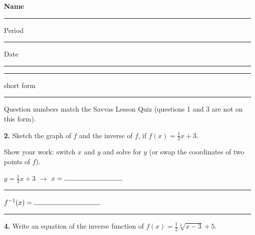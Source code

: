\documentclass[11pt]{article}
\begin{document}
\noindent\textbf{Name}\; \rule{6cm}{0.4pt} \hfill Period \rule{1.2cm}{0.4pt} \quad Date \rule{2.2cm}{0.4pt}

\vspace{4pt}\noindent\rule{\textwidth}{0.6pt}

\vspace{2pt} \hfill {\small short form}

\vspace{4pt}\noindent\rule{\textwidth}{0.6pt}

{\small Question numbers match the Savvas Lesson Quiz (questions 1 and 3 are not on this form).}

\vspace{4pt}
\begin{minipage}[t]{0.50\textwidth}
\textbf{2.} Sketch the graph of $f$ and the inverse of $f$, if $f(x)=\tfrac12x+3$.

\vspace{8pt}
Show your work: switch $x$ and $y$ and solve for $y$ (or swap the coordinates of two points of $f$).

\vspace{10pt}
$y=\tfrac12x+3$ \;$\longrightarrow$\; $x=\rule{3cm}{0.4pt}$

\vspace{14pt}
\rule{\linewidth}{0.4pt}

\vspace{14pt}
$f^{-1}(x)=\rule{3.4cm}{0.4pt}$
\end{minipage}\hfill
\begin{minipage}[t]{0.46\textwidth}
\vspace{-6pt}
\end{minipage}

\vspace{6pt}\noindent\rule{\textwidth}{0.4pt}

\vspace{4pt}
\textbf{4.} Write an equation of the inverse function of $f(x)=\tfrac12\sqrt[3]{x-3}+5$.
\end{document}
